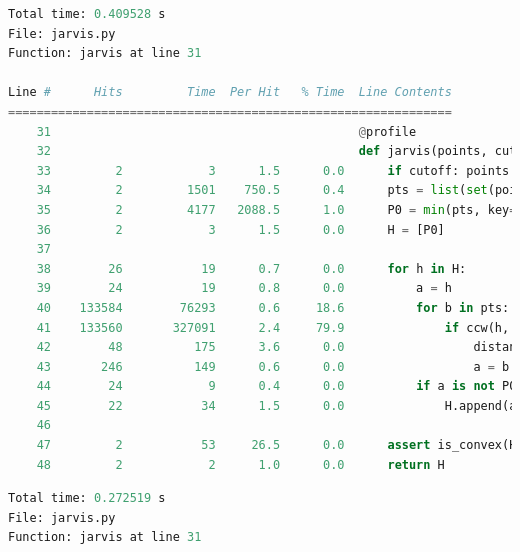 \documentclass[11pt,a4paper]{article}
\begin{document}
\begin{landscape}
\begin{lstlisting}[language=Python]
Total time: 0.409528 s
File: jarvis.py
Function: jarvis at line 31

Line #      Hits         Time  Per Hit   % Time  Line Contents
==============================================================
    31                                           @profile
    32                                           def jarvis(points, cutoff=False):
    33         2            3      1.5      0.0      if cutoff: points = interior_elimination(points)
    34         2         1501    750.5      0.4      pts = list(set(points))
    35         2         4177   2088.5      1.0      P0 = min(pts, key=lambda p: (p[1], p[0]))
    36         2            3      1.5      0.0      H = [P0]
    37                                               
    38        26           19      0.7      0.0      for h in H:
    39        24           19      0.8      0.0          a = h 
    40    133584        76293      0.6     18.6          for b in pts:
    41    133560       327091      2.4     79.9              if ccw(h, a, b) < 0 or (ccw(h, a, b) == 0 and \
    42        48          175      3.6      0.0                  distance(h, b) > distance(h, a)):
    43       246          149      0.6      0.0                  a = b
    44        24            9      0.4      0.0          if a is not P0:
    45        22           34      1.5      0.0              H.append(a)
    46                                           
    47         2           53     26.5      0.0      assert is_convex(H)
    48         2            2      1.0      0.0      return H
\end{lstlisting}


\begin{lstlisting}[language=Python]
Total time: 0.272519 s
File: jarvis.py
Function: jarvis at line 31


\end{lstlisting}
\end{landscape}
\end{document}
